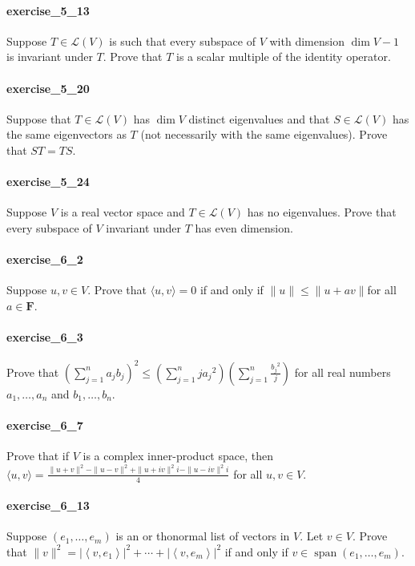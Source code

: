 \documentclass{article}
\begin{document}
\paragraph{exercise\_5\_13} Suppose $T \in \mathcal{L}(V)$ is such that every subspace of $V$ with dimension $\operatorname{dim} V-1$ is invariant under $T$. Prove that $T$ is a scalar multiple of the identity operator.

\paragraph{exercise\_5\_20} Suppose that $T \in \mathcal{L}(V)$ has $\operatorname{dim} V$ distinct eigenvalues and that $S \in \mathcal{L}(V)$ has the same eigenvectors as $T$ (not necessarily with the same eigenvalues). Prove that $S T=T S$.

\paragraph{exercise\_5\_24} Suppose $V$ is a real vector space and $T \in \mathcal{L}(V)$ has no eigenvalues. Prove that every subspace of $V$ invariant under $T$ has even dimension.

\paragraph{exercise\_6\_2} Suppose $u, v \in V$. Prove that $\langle u, v\rangle=0$ if and only if $\|u\| \leq\|u+a v\|$for all $a \in \mathbf{F}$.

\paragraph{exercise\_6\_3} Prove that $\left(\sum_{j=1}^{n} a_{j} b_{j}\right)^{2} \leq\left(\sum_{j=1}^{n} j a_{j}{ }^{2}\right)\left(\sum_{j=1}^{n} \frac{b_{j}{ }^{2}}{j}\right)$ for all real numbers $a_{1}, \ldots, a_{n}$ and $b_{1}, \ldots, b_{n}$.

\paragraph{exercise\_6\_7} Prove that if $V$ is a complex inner-product space, then $\langle u, v\rangle=\frac{\|u+v\|^{2}-\|u-v\|^{2}+\|u+i v\|^{2} i-\|u-i v\|^{2} i}{4}$ for all $u, v \in V$.

\paragraph{exercise\_6\_13} Suppose $\left(e_{1}, \ldots, e_{m}\right)$ is an or thonormal list of vectors in $V$. Let $v \in V$. Prove that $\|v\|^{2}=\left|\left\langle v, e_{1}\right\rangle\right|^{2}+\cdots+\left|\left\langle v, e_{m}\right\rangle\right|^{2}$ if and only if $v \in \operatorname{span}\left(e_{1}, \ldots, e_{m}\right)$.
\end{document}
